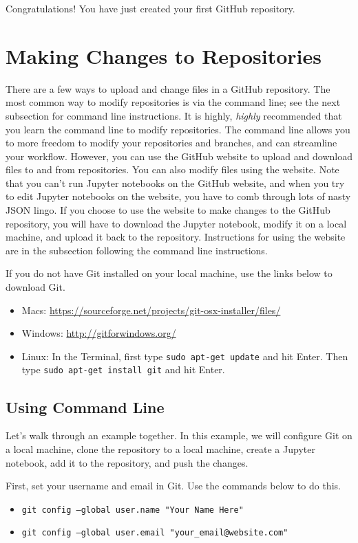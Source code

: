 \documentclass[11pt,a4paper]{article}
\begin{document}
Congratulations!
You have just created your first GitHub repository.

\section*{Making Changes to Repositories}
There are a few ways to upload and change files in a GitHub repository.
The most common way to modify repositories is via the command line; see the next subsection for command line instructions.
It is highly, \textit{highly} recommended that you learn the command line to modify repositories.
The command line allows you to more freedom to modify your repositories and branches, and can streamline your workflow.
However, you can use the GitHub website to upload and download files to and from repositories.
You can also modify files using the website.
Note that you can't run Jupyter notebooks on the GitHub website, and when you try to edit Jupyter notebooks on the website, you have to comb through lots of nasty JSON lingo.
If you choose to use the website to make changes to the GitHub repository, you will have to download the Jupyter notebook, modify it on a local machine, and upload it back to the repository.
Instructions for using the website are in the subsection following the command line instructions.

If you do not have Git installed on your local machine, use the links below to download Git.
\begin{itemize}
\item[] Macs: \url{https://sourceforge.net/projects/git-osx-installer/files/}
\item[] Windows: \url{http://gitforwindows.org/}
\item[] Linux: In the Terminal, first type \texttt{sudo apt-get update} and hit Enter. Then type \texttt{sudo apt-get install git} and hit Enter.
\end{itemize} 

\subsection*{Using Command Line}
Let's walk through an example together.
In this example, we will configure Git on a local machine, clone the repository to a local machine, create a Jupyter notebook, add it to the repository, and push the changes.

First, set your username and email in Git.
Use the commands below to do this.

\begin{itemize}
\item[] \texttt{git config --global user.name "Your Name Here"}
\item[] \texttt{git config --global user.email "your\_email@website.com"}
\end{itemize}
\end{document}

